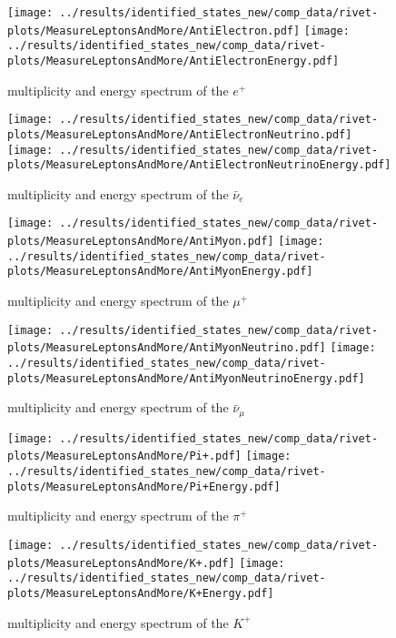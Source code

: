 \begin{figure}[h]
  \centering
  \texttt{[image: ../results/identified\_states\_new/comp\_data/rivet-plots/MeasureLeptonsAndMore/AntiElectron.pdf]}
  \texttt{[image: ../results/identified\_states\_new/comp\_data/rivet-plots/MeasureLeptonsAndMore/AntiElectronEnergy.pdf]}
  \caption{multiplicity and energy spectrum of the \(e^+\)}
\end{figure}
\begin{figure}[h]
  \centering
  \texttt{[image: ../results/identified\_states\_new/comp\_data/rivet-plots/MeasureLeptonsAndMore/AntiElectronNeutrino.pdf]}
  \texttt{[image: ../results/identified\_states\_new/comp\_data/rivet-plots/MeasureLeptonsAndMore/AntiElectronNeutrinoEnergy.pdf]}
  \caption{multiplicity and energy spectrum of the \(\bar{\nu}_e\)}
\end{figure}
\begin{figure}[h]
  \centering
  \texttt{[image: ../results/identified\_states\_new/comp\_data/rivet-plots/MeasureLeptonsAndMore/AntiMyon.pdf]}
  \texttt{[image: ../results/identified\_states\_new/comp\_data/rivet-plots/MeasureLeptonsAndMore/AntiMyonEnergy.pdf]}
  \caption{multiplicity and energy spectrum of the \(\mu^+\)}
\end{figure}
\begin{figure}[h]
  \centering
  \texttt{[image: ../results/identified\_states\_new/comp\_data/rivet-plots/MeasureLeptonsAndMore/AntiMyonNeutrino.pdf]}
  \texttt{[image: ../results/identified\_states\_new/comp\_data/rivet-plots/MeasureLeptonsAndMore/AntiMyonNeutrinoEnergy.pdf]}
  \caption{multiplicity and energy spectrum of the \(\bar{\nu}_\mu\)}
\end{figure}

\begin{figure}[h]
  \centering
  \texttt{[image: ../results/identified\_states\_new/comp\_data/rivet-plots/MeasureLeptonsAndMore/Pi+.pdf]}
  \texttt{[image: ../results/identified\_states\_new/comp\_data/rivet-plots/MeasureLeptonsAndMore/Pi+Energy.pdf]}
  \caption{multiplicity and energy spectrum of the \(\pi^+\)}
\end{figure}
\begin{figure}[h]
  \centering
  \texttt{[image: ../results/identified\_states\_new/comp\_data/rivet-plots/MeasureLeptonsAndMore/K+.pdf]}
  \texttt{[image: ../results/identified\_states\_new/comp\_data/rivet-plots/MeasureLeptonsAndMore/K+Energy.pdf]}
  \caption{multiplicity and energy spectrum of the \(K^+\)}
\end{figure}

